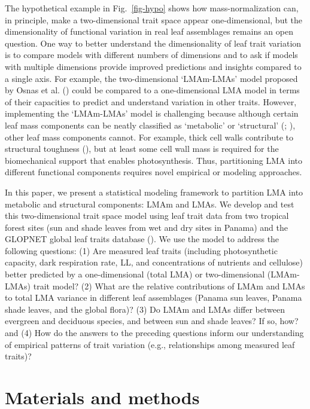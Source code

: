 \documentclass[
  12pt,
  letterpaper,
  DIV=11,
  numbers=noendperiod]{scrartcl}
\begin{document}
The hypothetical example in Fig.~\ref{fig-hypo} shows how
mass-normalization can, in principle, make a two-dimensional trait space
appear one-dimensional, but the dimensionality of functional variation
in real leaf assemblages remains an open question. One way to better
understand the dimensionality of leaf trait variation is to compare
models with different numbers of dimensions and to ask if models with
multiple dimensions provide improved predictions and insights compared
to a single axis. For example, the two-dimensional `LMAm-LMAs' model
proposed by Osnas et al. () could be
compared to a one-dimensional LMA model in terms of their capacities to
predict and understand variation in other traits. However, implementing
the `LMAm-LMAs' model is challenging because although certain leaf mass
components can be neatly classified as `metabolic' or `structural'
(;
), other leaf mass components
cannot. For example, thick cell walls contribute to structural toughness
(), but at least some cell
wall mass is required for the biomechanical support that enables
photosynthesis. Thus, partitioning LMA into different functional
components requires novel empirical or modeling approaches.

In this paper, we present a statistical modeling framework to partition
LMA into metabolic and structural components: LMAm and LMAs. We develop
and test this two-dimensional trait space model using leaf trait data
from two tropical forest sites (sun and shade leaves from wet and dry
sites in Panama) and the GLOPNET global leaf traits database
(). We use the model to
address the following questions: (1) Are measured leaf traits (including
photosynthetic capacity, dark respiration rate, LL, and concentrations
of nutrients and cellulose) better predicted by a one-dimensional (total
LMA) or two-dimensional (LMAm-LMAs) trait model? (2) What are the
relative contributions of LMAm and LMAs to total LMA variance in
different leaf assemblages (Panama sun leaves, Panama shade leaves, and
the global flora)? (3) Do LMAm and LMAs differ between evergreen and
deciduous species, and between sun and shade leaves? If so, how? and (4)
How do the answers to the preceding questions inform our understanding
of empirical patterns of trait variation (e.g., relationships among
measured leaf traits)?

\section{Materials and methods}\label{materials-and-methods}
\end{document}
